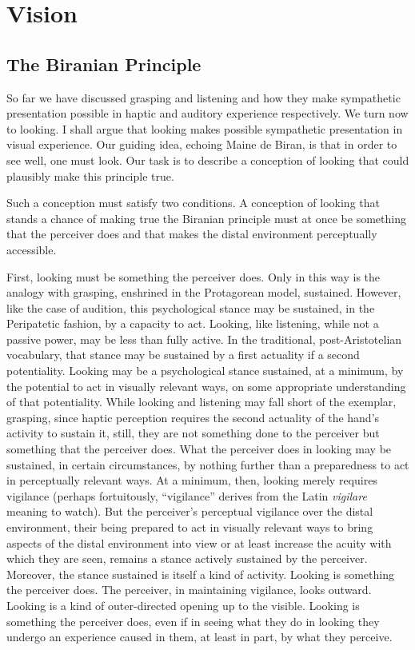 \chapter{Vision} %
\label{cha:vision}

\section{The Biranian Principle} %
\label{sec:the_birnaian_principle}

So far we have discussed grasping and listening and how they make sympathetic presentation possible in haptic and auditory experience respectively. We turn now to looking. I shall argue that looking makes possible sympathetic presentation in visual experience. Our guiding idea, echoing Maine de Biran, is that in order to see well, one must look. Our task is to describe a conception of looking that could plausibly make this principle true. 

Such a conception must satisfy two conditions. A conception of looking that stands a chance of making true the Biranian principle must at once be something that the perceiver does and that makes the distal environment perceptually accessible.

First, looking must be something the perceiver does. Only in this way is the analogy with grasping, enshrined in the Protagorean model, sustained. However, like the case of audition, this psychological stance may be sustained, in the Peripatetic fashion, by a capacity to act. Looking, like listening, while not a passive power, may be less than fully active. In the traditional, post-Aristotelian vocabulary, that stance may be sustained by a first actuality if a second potentiality. Looking may be a psychological stance sustained, at a minimum, by the potential to act in visually relevant ways, on some appropriate understanding of that potentiality. While looking and listening may fall short of the exemplar, grasping, since haptic perception requires the second actuality of the hand's activity to sustain it, still, they are not something done to the perceiver but something that the perceiver does. What the perceiver does in looking may be sustained, in certain circumstances, by nothing further than a preparedness to act in perceptually relevant ways. At a minimum, then, looking merely requires vigilance (perhaps fortuitously, ``vigilance'' derives from the Latin \emph{vigilare} meaning to watch). But the perceiver's perceptual vigilance over the distal environment, their being prepared to act in visually relevant ways to bring aspects of the distal environment into view or at least increase the acuity with which they are seen, remains a stance actively sustained by the perceiver. Moreover, the stance sustained is itself a kind of activity. Looking is something the perceiver does. The perceiver, in maintaining vigilance, looks outward. Looking is a kind of outer-directed opening up to the visible. Looking is something the perceiver does, even if in seeing what they do in looking they undergo an experience caused in them, at least in part, by what they perceive.


